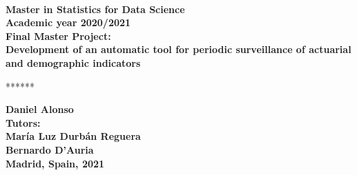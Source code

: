 \documentclass[15pt]{article}
\begin{document}
	\begin{titlepage}
	\begin{center}
	\begin{figure}[H]
		\centering
	\end{figure}
	\\[2 cm]
	\textbf{\large Master in Statistics for Data Science}\\[0.1 cm]
	\textbf{\large Academic year 2020/2021}\\[1.5 cm]
	\textbf{\large Final Master Project:}\\[0.1 cm]
	\linespread{2}\selectfont\bfseries{\LARGE Development of an automatic tool for periodic surveillance of actuarial and demographic indicators}
	\\[3 cm]
	\centerline{******}
	\textbf{\LARGE Daniel Alonso}\\[0.6cm]
	\textbf{Tutors:}\\[0.01cm]
	\textbf{\large María Luz Durbán Reguera \\ Bernardo D'Auria}\\[1 cm]
	\textbf{\large Madrid, Spain, 2021}

	\end{center}
	\end{titlepage} 
\end{document}
